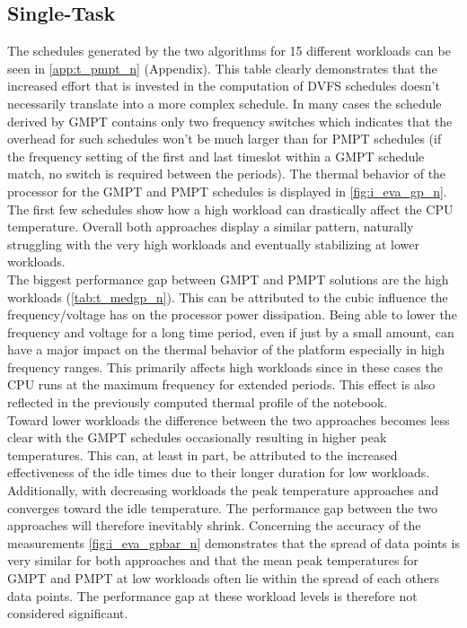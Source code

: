 \subsection{Single-Task}
The schedules generated by the two algorithms for 15 different workloads can be seen in \autoref{app:t_pmpt_n} (Appendix). This table clearly demonstrates that the increased effort that is invested in the computation of DVFS schedules doesn't necessarily translate into a more complex schedule. In many cases the schedule derived by GMPT contains only two frequency switches which indicates that the overhead for such schedules won't be much larger than for PMPT schedules (if the frequency setting of the first and last timeslot within a GMPT schedule match, no switch is required between the periods). The thermal behavior of the processor for the GMPT and PMPT schedules is displayed in \autoref{fig:i_eva_gp_n}.\\

The first few schedules show how a high workload can drastically affect the CPU temperature. Overall both approaches display a similar pattern, naturally struggling with the very high workloads and eventually stabilizing at lower workloads.\\
\hspace*{0.5ex}\hspace{0.5ex} The biggest performance gap between GMPT and PMPT solutions are the high workloads (\autoref{tab:t_medgp_n}). This can be attributed to the cubic influence the frequency/voltage has on the processor power dissipation. Being able to lower the frequency and voltage for a long time period, even if just by a small amount, can have a major impact on the thermal behavior of the platform especially in high frequency ranges. This primarily affects high workloads since in these cases the CPU runs at the maximum frequency for extended periods. This effect is also reflected in the previously computed thermal profile of the notebook.\\

Toward lower workloads the difference between the two approaches becomes less clear with the GMPT schedules occasionally resulting in higher peak temperatures. This can, at least in part, be attributed to the increased effectiveness of the idle times due to their longer duration for low workloads. Additionally, with decreasing workloads the peak temperature approaches and converges toward the idle temperature. The performance gap between the two approaches will therefore inevitably shrink. Concerning the accuracy of the measurements \autoref{fig:i_eva_gpbar_n} demonstrates that the spread of data points is very similar for both approaches and that the mean peak temperatures for GMPT and PMPT at low workloads often lie within the spread of each others data points. The performance gap at these workload levels is therefore not considered significant.

